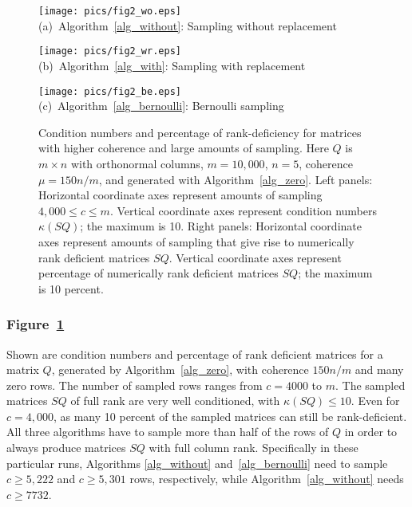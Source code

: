 \documentclass{siamltex}
\begin{document}
\begin{figure}  
\begin{center}
\resizebox{4.3in}{!}
{\texttt{[image: pics/fig2\_wo.eps]}} \\
{{{\footnotesize{{(a)\ Algorithm~\ref{alg_without}: Sampling without replacement}}}}}
\end{center}
\begin{center}
\resizebox{4.3in}{!}
{\texttt{[image: pics/fig2\_wr.eps]}} \\
{{{\footnotesize{{(b)\ Algorithm~\ref{alg_with}: Sampling with replacement}}}}}
\end{center}
\begin{center}
\resizebox{4.3in}{!}
{\texttt{[image: pics/fig2\_be.eps]}} \\
{{{\footnotesize{{(c)\ Algorithm~\ref{alg_bernoulli}: Bernoulli sampling}}}}}
\end{center}
\caption{Condition numbers and percentage of rank-deficiency for matrices
with higher coherence and large amounts of sampling. 
Here $Q$ is $m\times n$ with orthonormal 
columns, $m=10,000$, $n=5$, coherence $\mu=150n/m$, and generated with
Algorithm~\ref{alg_zero}.
Left panels: Horizontal coordinate axes represent amounts of sampling 
$4,000\leq c\leq m$. Vertical coordinate axes represent
condition numbers $\kappa(SQ)$; the maximum is 10.
Right panels: Horizontal coordinate axes represent amounts of sampling that
give rise to numerically rank deficient matrices $SQ$.  
Vertical coordinate axes represent percentage of
numerically rank deficient matrices $SQ$; the maximum is 10 percent.
}\label{f_fig2}
\end{figure}

\subsubsection*{Figure~\ref{f_fig2}} 
Shown are condition numbers and percentage
of rank deficient matrices for 
a matrix $Q$, generated by Algorithm~\ref{alg_zero},
with coherence $150n/m$ and many zero rows.
The number of sampled rows ranges from $c=4000$ to $m$.
The sampled matrices $SQ$ of full rank are very well
conditioned, with $\kappa(SQ)\leq 10$.
Even for $c=4,000$, as many 10 percent of the sampled matrices can
still be rank-deficient.
All three algorithms have to sample
more than half of the rows of $Q$ in order to always produce 
matrices $SQ$ with full column rank. Specifically in these particular runs,
Algorithms \ref{alg_without} and~\ref{alg_bernoulli} need to sample
$c\geq 5,222$ and $c\geq 5,301$ rows, respectively, while
Algorithm~\ref{alg_without} needs $c\geq 7732$.
\end{document}
